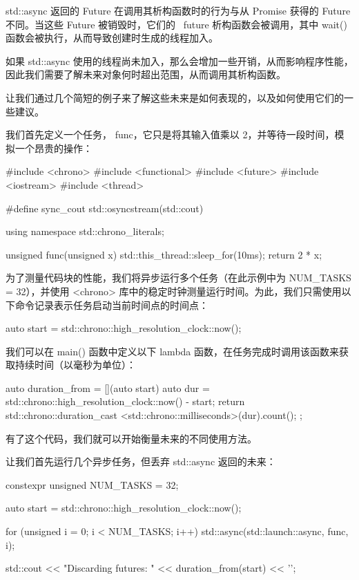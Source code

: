 std::async 返回的 Future 在调用其析构函数时的行为与从 Promise 获得的 Future 不同。当这些 Future 被销毁时，它们的 ~future 析构函数会被调用，其中 wait() 函数会被执行，从而导致创建时生成的线程加入。

如果 std::async 使用的线程尚未加入，那么会增加一些开销，从而影响程序性能，因此我们需要了解未来对象何时超出范围，从而调用其析构函数。

让我们通过几个简短的例子来了解这些未来是如何表现的，以及如何使用它们的一些建议。

我们首先定义一个任务， func，它只是将其输入值乘以 2，并等待一段时间，模拟一个昂贵的操作：

\begin{cpp}
#include <chrono>
#include <functional>
#include <future>
#include <iostream>
#include <thread>

#define sync_cout std::osyncstream(std::cout)

using namespace std::chrono_literals;

unsigned func(unsigned x) {
    std::this_thread::sleep_for(10ms);
    return 2 * x;
}
\end{cpp}

为了测量代码块的性能，我们将异步运行多个任务（在此示例中为 NUM\_TASKS = 32），并使用 <chrono> 库中的稳定时钟测量运行时间。为此，我们只需使用以下命令记录表示任务启动当前时间点的时间点：

\begin{cpp}
auto start = std::chrono::high_resolution_clock::now();
\end{cpp}

我们可以在 main() 函数中定义以下 lambda 函数，在任务完成时调用该函数来获取持续时间（以毫秒为单位）：

\begin{cpp}
auto duration_from = [](auto start) {
    auto dur = std::chrono::high_resolution_clock::now()
                - start;
    return std::chrono::duration_cast
                <std::chrono::milliseconds>(dur).count();
};
\end{cpp}

有了这个代码，我们就可以开始衡量未来的不同使用方法。

让我们首先运行几个异步任务，但丢弃 std::async 返回的未来：

\begin{cpp}
constexpr unsigned NUM_TASKS = 32;

auto start = std::chrono::high_resolution_clock::now();

for (unsigned i = 0; i < NUM_TASKS; i++) {
    std::async(std::launch::async, func, i);
}

std::cout << "Discarding futures: "
          << duration_from(start) << '\n';
\end{cpp}

